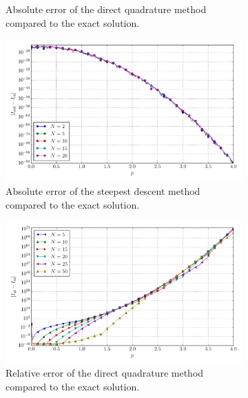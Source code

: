 \documentclass[a4paper,10pt]{article}
\begin{document}
\begin{figure}[ht!]
\begin{subfigure}[t]{0.5\linewidth}
    \caption{Absolute error of the direct quadrature method compared to the exact solution.}
    \label{fig:tp_2d_conv_p_10_01_err_qr}
  \end{subfigure}
  \begin{subfigure}[t]{0.5\linewidth}
    \includegraphics[width=\linewidth]{./plots/tp_2d_conv_p_(1,0)_(0,1)_err_nsd.pdf}
    \caption{Absolute error of the steepest descent method compared to the exact solution.}
    \label{fig:tp_2d_conv_p_10_01_err_nsd}
  \end{subfigure}
  \begin{subfigure}[t]{0.5\linewidth}
    \includegraphics[width=\linewidth]{./plots/tp_2d_conv_p_(1,0)_(0,1)_err_rel_qr.pdf}
    \caption{Relative error of the direct quadrature method compared to the exact solution.}
    \label{fig:tp_2d_conv_p_10_01_err_rel_qr}
  \end{subfigure}
  \begin{subfigure}[t]{0.5\linewidth}

\end{subfigure}
\end{figure}
\end{document}
